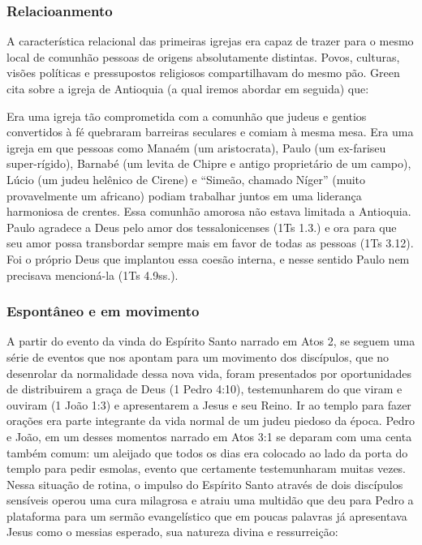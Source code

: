 \documentclass[
	12pt,				%
	openright,			%
	twoside,			%
	a4paper,			%
	english,			%
	french,				%
	spanish,			%
	brazil				%
	]{abntex2}
\begin{document}
\subsubsection{Relacioanmento}

A característica relacional das primeiras igrejas era capaz de trazer para o mesmo local de comunhão pessoas de origens absolutamente distintas. Povos, culturas, visões políticas e pressupostos religiosos compartilhavam do mesmo pão. Green cita sobre a igreja de Antioquia (a qual iremos abordar em seguida) que:

\begin{citacao}
Era uma igreja tão comprometida com a comunhão que judeus e gentios convertidos à fé quebraram barreiras seculares e comiam à mesma mesa. Era uma igreja em que pessoas como Manaém (um aristocrata), Paulo (um ex-fariseu super-rígido), Barnabé (um levita de Chipre e antigo proprietário de um campo), Lúcio (um judeu helênico de Cirene) e “Simeão, chamado Níger” (muito provavelmente um africano)
podiam trabalhar juntos em uma liderança harmoniosa de crentes. Essa comunhão amorosa não estava limitada a Antioquia. Paulo agradece a Deus pelo amor dos tessalonicenses (1Ts 1.3.) e ora para que seu amor possa transbordar sempre mais em favor de todas as pessoas (1Ts 3.12). Foi o próprio Deus que
implantou essa coesão interna, e nesse sentido Paulo nem precisava mencioná-la (1Ts 4.9ss.).
\end{citacao}\cite[261]{green}

\subsubsection{Espontâneo e em movimento}

A partir do evento da vinda do Espírito Santo narrado em Atos 2, se seguem uma série de eventos que nos apontam para um movimento dos discípulos, que no desenrolar da normalidade dessa nova vida, foram presentados por oportunidades de distribuirem a graça de Deus (1 Pedro 4:10), testemunharem do que viram e ouviram (1 João 1:3) e apresentarem a Jesus e seu Reino. Ir ao templo para fazer orações era parte integrante da vida normal de um judeu piedoso da época. Pedro e João, em um desses momentos narrado em Atos 3:1 se deparam com uma centa também comum: um aleijado que todos os dias era colocado ao lado da porta do templo para pedir esmolas, evento que certamente testemunharam muitas vezes. Nessa situação de rotina, o impulso do Espírito Santo através de dois discípulos sensíveis operou uma cura milagrosa e atraiu uma multidão que deu para Pedro a plataforma para um sermão evangelístico que em poucas palavras já apresentava Jesus como o messias esperado, sua natureza divina e ressurreição:
\end{document}
